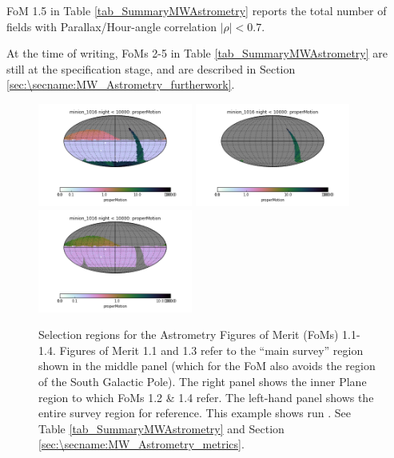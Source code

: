 FoM 1.5 in Table \ref{tab_SummaryMWAstrometry} reports the total number of fields with Parallax/Hour-angle correlation $|\rho| < 0.7$.

At the time of writing, FoMs 2-5 in Table
\ref{tab_SummaryMWAstrometry} are still at the specification stage,
and are described in Section
\ref{sec:\secname:MW_Astrometry_furtherwork}.


\begin{figure}[h]
  \begin{center}
    \includegraphics[width=2.0in]{./figs/milkyway/astromPanels/MW_Astrom_FoM_properMotion_minion_1016_all_skymap.png}
  \includegraphics[width=2.0in]{./figs/milkyway/astromPanels/MW_Astrom_FoM_properMotion_minion_1016_plane_skymap.png}
  \includegraphics[width=2.0in]{./figs/milkyway/astromPanels/MW_Astrom_FoM_properMotion_minion_1016_nonPlane_skymap.png}
    \end{center}
  \caption{Selection regions for the Astrometry Figures of Merit (FoMs) 1.1-1.4. Figures of Merit 1.1 and 1.3 refer to the ``main survey'' region shown in the middle panel (which for the FoM also avoids the region of the South Galactic Pole). The right panel shows the inner Plane region to which FoMs 1.2 \& 1.4 refer. The left-hand panel shows the entire survey region for reference. This example shows run . See Table \ref{tab_SummaryMWAstrometry} and Section \ref{sec:\secname:MW_Astrometry_metrics}.}
  \label{fig_astrom_RegionSelKey}
\end{figure}


